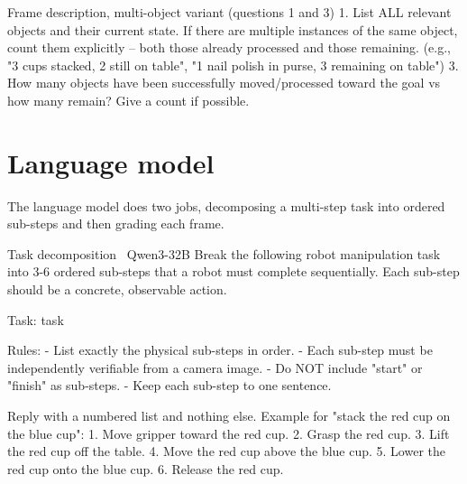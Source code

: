 \begin{vlmprompt}{Frame description, multi-object variant (questions 1 and 3)}
1. List ALL relevant objects and their current state. If there are multiple instances of the same object, count them explicitly -- both those already processed and those remaining. (e.g., "3 cups stacked, 2 still on table", "1 nail polish in purse, 3 remaining on table")
3. How many objects have been successfully moved/processed toward the goal vs how many remain? Give a count if possible.
\end{vlmprompt}

\section{Language model}

The language model does two jobs, decomposing a multi-step task into ordered sub-steps and then grading each frame.

\begin{llmprompt}{Task decomposition \textbullet\ Qwen3-32B}
Break the following robot manipulation task into 3-6 ordered sub-steps that a robot must complete sequentially. Each sub-step should be a concrete, observable action.

Task: {task}

Rules:
- List exactly the physical sub-steps in order.
- Each sub-step must be independently verifiable from a camera image.
- Do NOT include "start" or "finish" as sub-steps.
- Keep each sub-step to one sentence.

Reply with a numbered list and nothing else. Example for "stack the red cup on the blue cup":
1. Move gripper toward the red cup.
2. Grasp the red cup.
3. Lift the red cup off the table.
4. Move the red cup above the blue cup.
5. Lower the red cup onto the blue cup.
6. Release the red cup.
\end{llmprompt}

